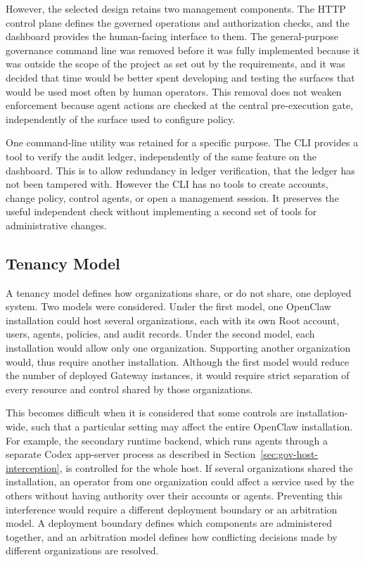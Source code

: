 However, the selected design retains two management components. The HTTP
control plane defines the governed operations and authorization checks, and the
dashboard provides the human-facing interface to them. The general-purpose
governance command line was removed before it was fully implemented because it was outside the scope of the project as set out by the requirements, and it was decided that time would be better spent developing and testing the surfaces that would be used most often by human operators. This removal does not weaken enforcement because agent
actions are checked at the central pre-execution gate, independently of the
surface used to configure policy.

One command-line utility was retained for a specific purpose. The CLI provides a tool to verify the audit ledger, independently of the same feature on the dashboard. This is to allow redundancy in ledger verification, that the ledger has not been tampered with. However the CLI has no tools to
create accounts, change policy, control agents, or open a management session.
It preserves the useful independent check without implementing a second set of tools for
administrative changes. 


\subsection{Tenancy Model}
\label{sec:gov-tenancy-model}

A tenancy model defines how organizations share, or do not share, one deployed
system. Two models were considered. Under the first model, one OpenClaw
installation could host several organizations, each with its own Root account,
users, agents, policies, and audit records. Under the second model, each
installation would allow only one organization. Supporting another organization
would, thus require another installation. Although the first model would
reduce the number of deployed Gateway instances, it would require strict
separation of every resource and control shared by those organizations.

This becomes difficult when it is considered that some controls are installation-wide, such that a particular setting may affect the
entire OpenClaw installation. For example, the secondary runtime backend, which
runs agents through a separate Codex app-server process as described in
Section~\ref{sec:gov-host-interception}, is controlled for the whole host. If
several organizations shared the installation, an operator from one
organization could affect a service used by the others without having authority
over their accounts or agents. Preventing this interference would require a
different deployment boundary or an arbitration model. A deployment boundary
defines which components are administered together, and an arbitration model
defines how conflicting decisions made by different organizations are
resolved.

